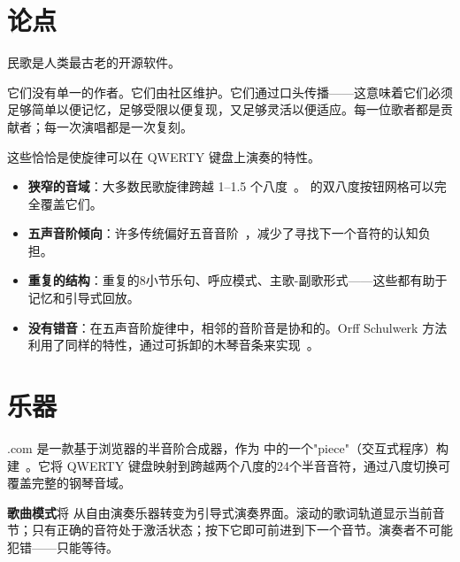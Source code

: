 \documentclass[11pt]{article}
\begin{document}
\section{论点}

民歌是人类最古老的开源软件。

它们没有单一的作者。它们由社区维护。它们通过口头传播——这意味着它们必须足够简单以便记忆，足够受限以便复现，又足够灵活以便适应。每一位歌者都是贡献者；每一次演唱都是一次复刻。

\vspace{0.3em}

这些恰恰是使旋律可以在 QWERTY 键盘上演奏的特性。

\begin{card}
\begin{itemize}
  \item \textbf{狭窄的音域}：大多数民歌旋律跨越 1--1.5 个八度~\citep{lomax1968folk}。\np{} 的双八度按钮网格可以完全覆盖它们。
  \item \textbf{五声音阶倾向}：许多传统偏好五音音阶~\citep{kodaly1971folk}，减少了寻找下一个音符的认知负担。
  \item \textbf{重复的结构}：重复的8小节乐句、呼应模式、主歌-副歌形式——这些都有助于记忆和引导式回放。
  \item \textbf{没有错音}：在五声音阶旋律中，相邻的音阶音是协和的。Orff Schulwerk 方法利用了同样的特性，通过可拆卸的木琴音条来实现~\citep{orff1978schulwerk}。
\end{itemize}
\end{card}

\section{乐器}

\np{}.com 是一款基于浏览器的半音阶合成器，作为 \ac{} 中的一个"piece"（交互式程序）构建~\citep{scudder2026ac, scudder2026notepat}。它将 QWERTY 键盘映射到跨越两个八度的24个半音音符，通过八度切换可覆盖完整的钢琴音域。

\begin{darkcard}
\textbf{歌曲模式}将 \np{} 从自由演奏乐器转变为引导式演奏界面。滚动的歌词轨道显示当前音节；只有正确的音符处于激活状态；按下它即可前进到下一个音节。演奏者不可能犯错——只能等待。
\end{darkcard}
\end{document}
